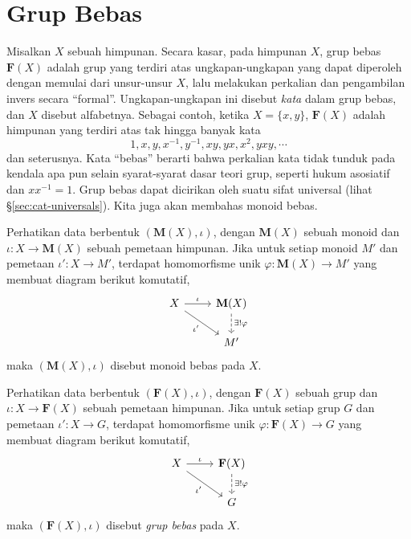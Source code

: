 \section{Grup Bebas}\label{sec:free-group}
Misalkan $X$ sebuah himpunan. Secara kasar, pada himpunan $X$, grup bebas $\mathbf{F}(X)$ adalah grup yang terdiri atas ungkapan-ungkapan yang dapat diperoleh dengan memulai dari unsur-unsur $X$, lalu melakukan perkalian dan pengambilan invers secara ``formal''. Ungkapan-ungkapan ini disebut \emph{kata} dalam grup bebas, dan $X$ disebut alfabetnya. Sebagai contoh, ketika $X=\{x,y\}$, $\mathbf{F}(X)$ adalah himpunan yang terdiri atas tak hingga banyak kata
\[ 1, x, y, x^{-1}, y^{-1}, xy, yx, x^2, yxy, \cdots \]
dan seterusnya. Kata ``bebas'' berarti bahwa perkalian kata tidak tunduk pada kendala apa pun selain syarat-syarat dasar teori grup, seperti hukum asosiatif dan $x x^{-1}=1$. Grup bebas dapat dicirikan oleh suatu sifat universal (lihat \S\ref{sec:cat-universals}). Kita juga akan membahas monoid bebas.

\begin{definition}\label{def:free-monoid}
	Perhatikan data berbentuk $(\mathbf{M}(X), \iota)$, dengan $\mathbf{M}(X)$ sebuah monoid dan $\iota: X \to \mathbf{M}(X)$ sebuah pemetaan himpunan. Jika untuk setiap monoid $M'$ dan pemetaan $\iota': X \to M'$, terdapat homomorfisme unik $\varphi: \mathbf{M}(X) \to M'$ yang membuat diagram berikut komutatif,
	\[ \begin{tikzcd}
		X \arrow[r, "\iota"] \arrow[rd, "{\iota'}"'] & \mathbf{M}(X) \arrow[dashed, d, "{\exists! \varphi}"] \\
		& M'
	\end{tikzcd} \]
	maka $(\mathbf{M}(X), \iota)$ disebut monoid bebas pada $X$.
\end{definition}

\begin{definition}\label{def:free-group}
	Perhatikan data berbentuk $(\mathbf{F}(X), \iota)$, dengan $\mathbf{F}(X)$ sebuah grup dan $\iota: X \to \mathbf{F}(X)$ sebuah pemetaan himpunan. Jika untuk setiap grup $G$ dan pemetaan $\iota': X \to G$, terdapat homomorfisme unik $\varphi: \mathbf{F}(X) \to G$ yang membuat diagram berikut komutatif,
	\[ \begin{tikzcd}
		X \arrow[r, "\iota"] \arrow[rd, "{\iota'}"'] & \mathbf{F}(X) \arrow[dashed, d, "{\exists! \varphi}"] \\
		& G
	\end{tikzcd} \]
	maka $(\mathbf{F}(X), \iota)$ disebut \emph{grup bebas} pada $X$.
\end{definition}


